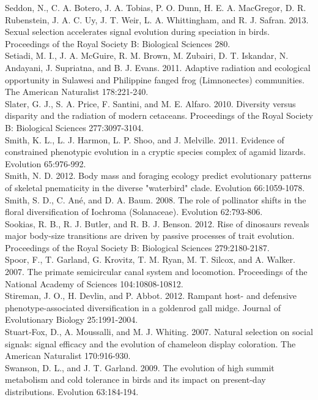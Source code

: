 Seddon, N., C. A. Botero, J. A. Tobias, P. O. Dunn, H. E. A. MacGregor, D. R. Rubenstein, J. A. C. Uy, J. T. Weir, L. A. Whittingham, and R. J. Safran. 2013. Sexual selection accelerates signal evolution during speciation in birds. Proceedings of the Royal Society B: Biological Sciences 280.\\
Setiadi, M. I., J. A. McGuire, R. M. Brown, M. Zubairi, D. T. Iskandar, N. Andayani, J. Supriatna, and B. J. Evans. 2011. Adaptive radiation and ecological opportunity in Sulawesi and Philippine fanged frog (Limnonectes) communities. The American Naturalist 178:221-240.\\
Slater, G. J., S. A. Price, F. Santini, and M. E. Alfaro. 2010. Diversity versus disparity and the radiation of modern cetaceans. Proceedings of the Royal Society B: Biological Sciences 277:3097-3104.\\
Smith, K. L., L. J. Harmon, L. P. Shoo, and J. Melville. 2011. Evidence of constrained phenotypic evolution in a cryptic species complex of agamid lizards. Evolution 65:976-992.\\
Smith, N. D. 2012. Body mass and foraging ecology predict evolutionary patterns of skeletal pnematicity in the diverse "waterbird" clade. Evolution 66:1059-1078.\\
Smith, S. D., C. An\'{e}, and D. A. Baum. 2008. The role of pollinator shifts in the floral diversification of Iochroma (Solanaceae). Evolution 62:793-806.\\
Sookias, R. B., R. J. Butler, and R. B. J. Benson. 2012. Rise of dinosaurs reveals major body-size transitions are driven by passive processes of trait evolution. Proceedings of the Royal Society B: Biological Sciences 279:2180-2187.\\
Spoor, F., T. Garland, G. Krovitz, T. M. Ryan, M. T. Silcox, and A. Walker. 2007. The primate semicircular canal system and locomotion. Proceedings of the National Academy of Sciences 104:10808-10812.\\
Stireman, J. O., H. Devlin, and P. Abbot. 2012. Rampant host- and defensive phenotype-associated diversification in a goldenrod gall midge. Journal of Evolutionary Biology 25:1991-2004.\\
Stuart‐Fox, D., A. Moussalli, and M. J. Whiting. 2007. Natural selection on social signals: signal efficacy and the evolution of chameleon display coloration. The American Naturalist 170:916-930.\\
Swanson, D. L., and J. T. Garland. 2009. The evolution of high summit metabolism and cold tolerance in birds and its impact on present-day distributions. Evolution 63:184-194.\\
